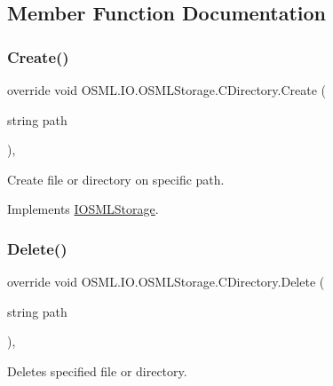 \subsection{Member Function Documentation}
\mbox{\label{classOSML_1_1IO_1_1OSMLStorage_1_1CDirectory_a25890d178542da52c0b87200cfe3cb87}} 
\subsubsection{\texorpdfstring{Create()}{Create()}}
{\footnotesize\ttfamily override void O\+S\+M\+L.\+I\+O.\+O\+S\+M\+L\+Storage.\+C\+Directory.\+Create (\begin{DoxyParamCaption}\item[{string}]{path }\end{DoxyParamCaption})\hspace{0.3cm}{\ttfamily [inline]}, {\ttfamily [virtual]}}



Create file or directory on specific path. 



Implements \mbox{\hyperlink{classIOSMLStorage_a95cdf051ac2045a9cfa4fb29a78b26c0}{I\+O\+S\+M\+L\+Storage}}.

\mbox{\label{classOSML_1_1IO_1_1OSMLStorage_1_1CDirectory_a6568c6fcd267277ec3e032802fe50d1c}} 
\subsubsection{\texorpdfstring{Delete()}{Delete()}}
{\footnotesize\ttfamily override void O\+S\+M\+L.\+I\+O.\+O\+S\+M\+L\+Storage.\+C\+Directory.\+Delete (\begin{DoxyParamCaption}\item[{string}]{path }\end{DoxyParamCaption})\hspace{0.3cm}{\ttfamily [inline]}, {\ttfamily [virtual]}}



Deletes specified file or directory. 



